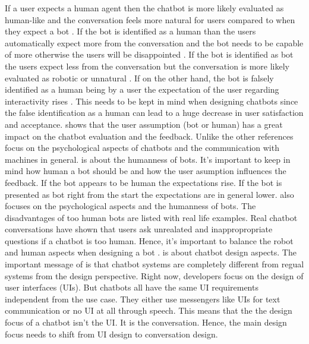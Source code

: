 If a user expects a human agent then the chatbot is more likely evaluated as human-like and the conversation 
feels more natural for users compared to when they expect a bot \cite{sundar2016theoretical}.
If the bot is identified as a human than the users automatically expect more from the conversation and the 
bot needs to be capable of more otherwise the users will be disappointed \cite{GO2019304}.
If the bot is identified as bot the users expect less from the conversation but the conversation 
is more likely evaluated as robotic or unnatural \cite{GO2019304}.
If on the other hand, the bot is falsely identified as a human being by a user the expectation of the user regarding 
interactivity rises \cite{GO2019304}.
This needs to be kept in mind when designing chatbots since the false identification as a human 
can lead to a huge decrease in user satisfaction and acceptance.
\citet{GO2019304} shows that the user assumption (bot or human) has a great impact 
on the chatbot evaluation and the feedback.
Unlike the other references \citet{folstad2017chatbots, brandtzaeg2018chatbots, GO2019304}
focus on the psychological aspects of chatbots and the communication with machines in general.
\citet{GO2019304} is about the humanness of bots.
It's important to keep in mind how human a bot should be and how the user asumption influences 
the feedback.
If the bot appears to be human the expectations rise.
If the bot is presented as bot right from the start the expectations are in general lower.
\citet{brandtzaeg2018chatbots} also focuses on the psychological aspects and the humanness of bots.
The disadvantages of too human bots are listed with real life examples. 
Real chatbot conversations have shown that users ask unrealated and inappropropriate questions 
if a chatbot is too human. 
Hence, it's important to balance the robot and human aspects when designing a bot \cite{brandtzaeg2018chatbots}.
\citet{dutta2017developing} is about chatbot design aspects.
The important message of \citet{dutta2017developing} is that chatbot systems are completely different from regual systems from 
the design perspective.
Right now, developers focus on the design of user interfaces (UIs).
But chatbots all have the same UI requirements independent from the use case.
They either use messengers like UIs for text communication or no UI at all through speech.
This means that the the design focus of a chatbot isn't the UI.
It is the conversation.
Hence, the main design focus needs to shift from UI design to conversation design.

